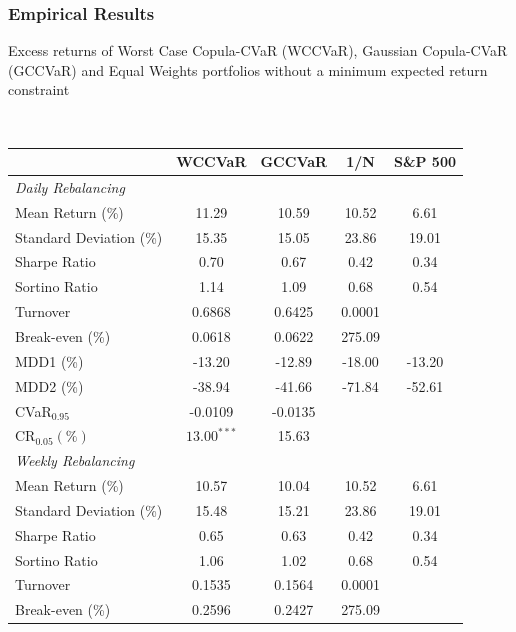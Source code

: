 \documentclass[pdf,9pt,xcolor=dvipsnames,hide notes]{beamer}
\begin{document}
\begin{frame}
	\frametitle{Empirical Results}
	
	
	\begin{threeparttable}[H]
		\caption{Excess returns of Worst Case Copula-CVaR (WCCVaR), Gaussian Copula-CVaR (GCCVaR) and Equal Weights portfolios without a minimum expected return constraint}
		\label{tab:tabletwo}\centering
		\tiny \
		\begin{tabularx}{\textwidth}{@{\extracolsep{\fill}}lcccc@{}}
			\toprule & \textbf{WCCVaR} & \textbf{GCCVaR} & \textbf{1/N} & \textbf{S\&P 500%
			} \\
			\midrule[\heavyrulewidth] \textit{Daily Rebalancing} &  &  &  &  \\
			\midrule[\heavyrulewidth] Mean Return (\%) & \cellcolor{corn} 11.29 & 10.59 & 10.52 & 6.61
			\\
			Standard Deviation (\%) & 15.35 & \cellcolor{celadon} 15.05 & 23.86 & 19.01 \\
			Sharpe Ratio & \cellcolor{corn} 0.70 & 0.67 & 0.42 & 0.34 \\
			Sortino Ratio & 1.14 & 1.09 & 0.68 & 0.54 \\
			Turnover & 0.6868 & 0.6425 & 0.0001 &  \\
			Break-even (\%) & 0.0618 & 0.0622 & 275.09 &  \\
			MDD1 (\%) & -13.20 & \cellcolor{celadon} -12.89 & -18.00 & -13.20 \\
			MDD2 (\%) & \cellcolor{corn} -38.94 & -41.66 & -71.84 & -52.61 \\
			CVaR$_{0.95}$ & \cellcolor{corn} -0.0109 & -0.0135 &  &  \\
			CR$_{0.05} (\%)$ & \cellcolor{corn} $13.00^{***}$ & 15.63 &  &  \\
			\midrule[\heavyrulewidth] \textit{Weekly Rebalancing} &  &  &  &  \\
			\midrule[\heavyrulewidth] Mean Return (\%) & 10.57 & 10.04 & 10.52 & 6.61
			\\
			Standard Deviation (\%) & 15.48 & 15.21 & 23.86 & 19.01 \\
			Sharpe Ratio & 0.65 & 0.63 & 0.42 & 0.34 \\
			Sortino Ratio & 1.06 & 1.02 & 0.68 & 0.54 \\
			Turnover & 0.1535 & 0.1564 & 0.0001 &  \\
			Break-even (\%) & \cellcolor{corn} 0.2596 & 0.2427 & 275.09 &  \\

\end{tabularx}
\end{threeparttable}
\end{frame}
\end{document}
